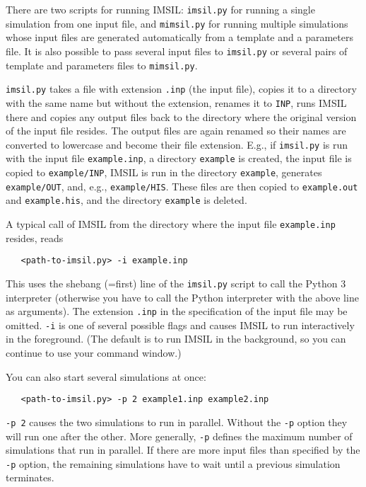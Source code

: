 There are two scripts for running IMSIL: \texttt{imsil.py} for running a
single simulation from one input file, and \texttt{mimsil.py} for running
multiple simulations whose input files are generated automatically from a
template and a parameters file. It is also possible to pass several input files
to \texttt{imsil.py} or several pairs of template and parameters files to
\texttt{mimsil.py}.

\texttt{imsil.py} takes a file with extension \texttt{.inp} (the input file),
copies it to a directory with the same name but without the extension,
renames it to \texttt{INP}, runs IMSIL there and copies any output files back to
the directory where the original version of the input file resides. The output
files are again renamed so their names are converted to lowercase and become
their file extension. E.g., if \texttt{imsil.py} is run with the input file
\texttt{example.inp}, a directory \texttt{example} is created, the input file is
copied to \texttt{example/INP}, IMSIL is run in the directory \texttt{example},
generates \texttt{example/OUT}, and, e.g., \texttt{example/HIS}. These files are
then copied to \texttt{example.out} and \texttt{example.his}, and the directory
\texttt{example} is deleted.

A typical call of IMSIL from the directory where the input file
\texttt{example.inp} resides, reads
%
\begin{verbatim}
   <path-to-imsil.py> -i example.inp
\end{verbatim}
%
This uses the shebang (=first) line of the \texttt{imsil.py} script to call the
Python 3 interpreter (otherwise you have to call the Python interpreter with
the above line as arguments). The extension \texttt{.inp} in the specification
of the input file may be omitted. \texttt{-i} is one of several possible flags
and causes IMSIL to run interactively in the foreground. (The default is to run
IMSIL in the background, so you can continue to use your command window.)

You can also start several simulations at once:
%
\begin{verbatim}
   <path-to-imsil.py> -p 2 example1.inp example2.inp
\end{verbatim}
%
\texttt{-p 2} causes the two simulations to run in parallel. Without the
\texttt{-p} option they will run one after the other. More generally,
\texttt{-p} defines the maximum number of simulations that run in parallel. If
there are more input files than specified by the \texttt{-p} option, the
remaining simulations have to wait until a previous simulation terminates.


